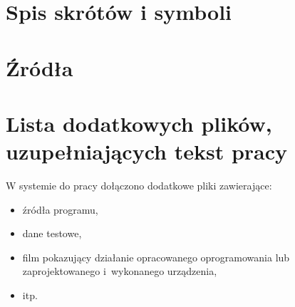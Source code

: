 \documentclass[a4paper,twoside,12pt]{book}
\begin{document}
\begin{appendices}
\chapter{Spis skrótów i symboli}



\chapter{Źródła}






\chapter{Lista dodatkowych plików, uzupełniających tekst pracy} 


W systemie do pracy dołączono dodatkowe pliki zawierające:
\begin{itemize}
\item źródła programu,
\item dane testowe,
\item film pokazujący działanie opracowanego oprogramowania lub zaprojektowanego i~wykonanego urządzenia,
\item itp.
\end{itemize}


\listoffigures
{}
\listoftables
{}

\end{appendices}
\end{document}
